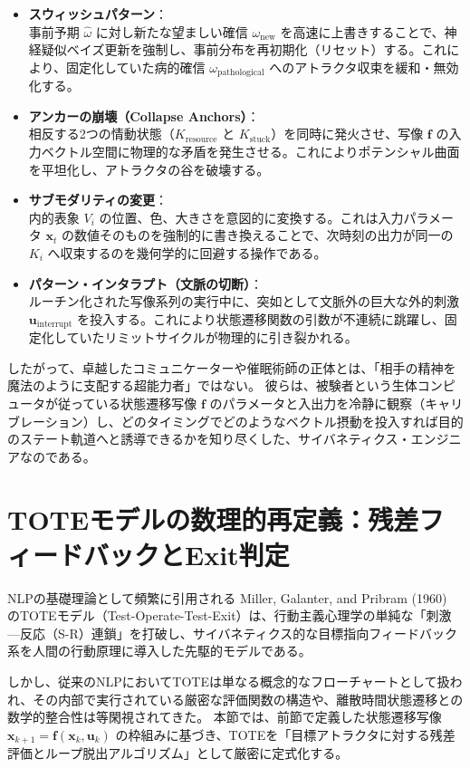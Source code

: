 \begin{itemize}
    \item \textbf{スウィッシュパターン}：\\
    事前予期 $\hat{\omega}$ に対し新たな望ましい確信 $\omega_{\mathrm{new}}$ を高速に上書きすることで、神経疑似ベイズ更新を強制し、事前分布を再初期化（リセット）する。これにより、固定化していた病的確信 $\omega_{\mathrm{pathological}}$ へのアトラクタ収束を緩和・無効化する。
    \item \textbf{アンカーの崩壊（Collapse Anchors）}：\\
    相反する2つの情動状態（$K_{\mathrm{resource}}$ と $K_{\mathrm{stuck}}$）を同時に発火させ、写像 $\boldsymbol{f}$ の入力ベクトル空間に物理的な矛盾を発生させる。これによりポテンシャル曲面を平坦化し、アトラクタの谷を破壊する。
    \item \textbf{サブモダリティの変更}：\\
    内的表象 $V_i$ の位置、色、大きさを意図的に変換する。これは入力パラメータ $\boldsymbol{x}_t$ の数値そのものを強制的に書き換えることで、次時刻の出力が同一の $K_i$ へ収束するのを幾何学的に回避する操作である。
    \item \textbf{パターン・インタラプト（文脈の切断）}：\\
    ルーチン化された写像系列の実行中に、突如として文脈外の巨大な外的刺激 $\boldsymbol{u}_{\mathrm{interrupt}}$ を投入する。これにより状態遷移関数の引数が不連続に跳躍し、固定化していたリミットサイクルが物理的に引き裂かれる。
\end{itemize}

したがって、卓越したコミュニケーターや催眠術師の正体とは、「相手の精神を魔法のように支配する超能力者」ではない。
彼らは、被験者という生体コンピュータが従っている状態遷移写像 $\boldsymbol{f}$ のパラメータと入出力を冷静に観察（キャリブレーション）し、どのタイミングでどのようなベクトル摂動を投入すれば目的のステート軌道へと誘導できるかを知り尽くした、サイバネティクス・エンジニアなのである。
\section{TOTEモデルの数理的再定義：残差フィードバックとExit判定}

NLPの基礎理論として頻繁に引用される Miller, Galanter, and Pribram (1960) のTOTEモデル（Test-Operate-Test-Exit）は、行動主義心理学の単純な「刺激—反応（S-R）連鎖」を打破し、サイバネティクス的な目標指向フィードバック系を人間の行動原理に導入した先駆的モデルである。

しかし、従来のNLPにおいてTOTEは単なる概念的なフローチャートとして扱われ、その内部で実行されている厳密な評価関数の構造や、離散時間状態遷移との数学的整合性は等閑視されてきた。
本節では、前節で定義した状態遷移写像 $\boldsymbol{x}_{k+1} = \boldsymbol{f}(\boldsymbol{x}_k, \boldsymbol{u}_k)$ の枠組みに基づき、TOTEを「目標アトラクタに対する残差評価とループ脱出アルゴリズム」として厳密に定式化する。

